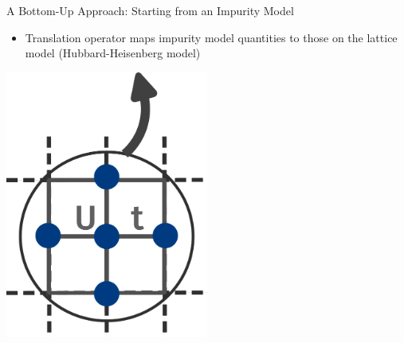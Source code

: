 \documentclass[10pt,aspectratio=169]{beamer}
\begin{document}
\begin{frame}{A Bottom-Up Approach: Starting from an Impurity Model}
{\begin{minipage}{0.55\textwidth}
\begin{itemize}[<+->]
		\item \alert{Translation} operator maps impurity model quantities to those on the lattice model (\alert{Hubbard-Heisenberg} model)
	\end{itemize}
	\end{minipage}
	\hfill
	\begin{minipage}{0.4\textwidth}
		\hfill
		\includegraphics[width=0.5\textwidth]{tiling.pdf}
	\end{minipage}
	}
\end{frame}
\end{document}
